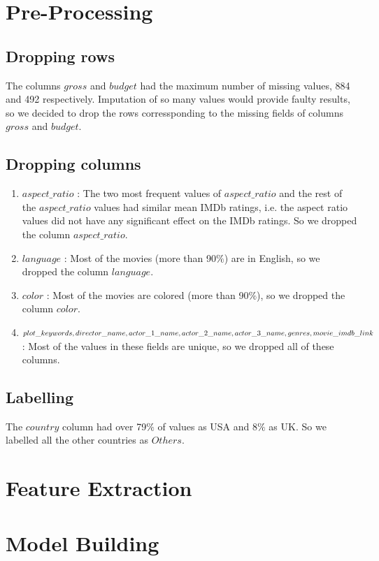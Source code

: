 \documentclass[conference]{IEEEtran}
\begin{document}
\section{Pre-Processing}
\subsection{Dropping rows}
The columns $gross$ and $budget$ had the maximum number of missing values, 884 and 492 respectively. Imputation of so many values would provide faulty results, so we decided to drop the rows corressponding to the missing fields of columns $gross$ and $budget$.
\subsection{Dropping columns}
	\begin{enumerate}
		\item $aspect\_ratio$ : The two most frequent values of $aspect\_ratio			$ and the rest of the $aspect\_ratio$ values had similar mean IMDb 				ratings, i.e. the aspect ratio values did not have any significant effect on the IMDb ratings. So we dropped the column $aspect\_ratio$.
		\item $language$ : Most of the movies (more than 90$\%$) are in 				English, so we dropped the column $language$.
		\item $color$ : Most of the movies are colored (more than 90$\%$), so 			we dropped the column $color$.
		\item $plot\_keywords, director\_name, actor\_1\_name, actor\_2\_name,			\\ actor\_3\_name, genres, movie\_imdb\_link$ : Most of the values in 			these fields are unique, so we dropped all of these columns.
	\end{enumerate}
\subsection{Labelling}
The $country$ column had over 79$\%$ of values as USA and 8$\%$ as UK. So we labelled all the other countries as $Others$.


\section{Feature Extraction}
\section{Model Building}
\newpage


\end{document}
